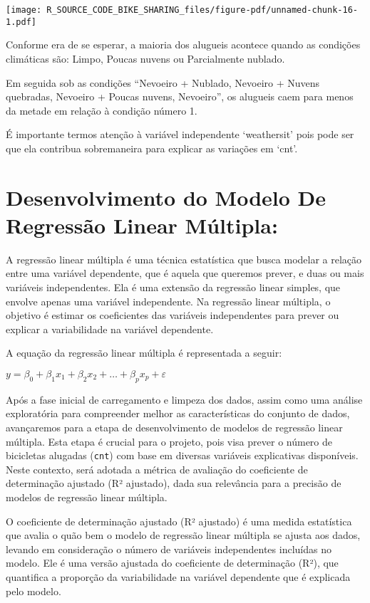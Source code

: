 \documentclass[
  letterpaper,
  DIV=11,
  numbers=noendperiod]{scrartcl}
\begin{document}
\begin{center}
\texttt{[image: R\_SOURCE\_CODE\_BIKE\_SHARING\_files/figure-pdf/unnamed-chunk-16-1.pdf]}
\end{center}

Conforme era de se esperar, a maioria dos alugueis acontece quando as
condições climáticas são: Limpo, Poucas nuvens ou Parcialmente nublado.

Em seguida sob as condições ``Nevoeiro + Nublado, Nevoeiro + Nuvens
quebradas, Nevoeiro + Poucas nuvens, Nevoeiro'', os alugueis caem para
menos da metade em relação à condição número 1.

É importante termos atenção à variável independente `weathersit' pois
pode ser que ela contribua sobremaneira para explicar as variações em
`cnt'.

\section{Desenvolvimento do Modelo De Regressão Linear
Múltipla:}\label{desenvolvimento-do-modelo-de-regressuxe3o-linear-muxfaltipla}

A regressão linear múltipla é uma técnica estatística que busca modelar
a relação entre uma variável dependente, que é aquela que queremos
prever, e duas ou mais variáveis independentes. Ela é uma extensão da
regressão linear simples, que envolve apenas uma variável independente.
Na regressão linear múltipla, o objetivo é estimar os coeficientes das
variáveis independentes para prever ou explicar a variabilidade na
variável dependente.

A equação da regressão linear múltipla é representada a seguir:

\(y = \beta_0 + \beta_1 x_1 + \beta_2 x_2 + \ldots + \beta_p x_p + \varepsilon\)

Após a fase inicial de carregamento e limpeza dos dados, assim como uma
análise exploratória para compreender melhor as características do
conjunto de dados, avançaremos para a etapa de desenvolvimento de
modelos de regressão linear múltipla. Esta etapa é crucial para o
projeto, pois visa prever o número de bicicletas alugadas (\texttt{cnt})
com base em diversas variáveis explicativas disponíveis. Neste contexto,
será adotada a métrica de avaliação do coeficiente de determinação
ajustado (R² ajustado), dada sua relevância para a precisão de modelos
de regressão linear múltipla.

O coeficiente de determinação ajustado (R² ajustado) é uma medida
estatística que avalia o quão bem o modelo de regressão linear múltipla
se ajusta aos dados, levando em consideração o número de variáveis
independentes incluídas no modelo. Ele é uma versão ajustada do
coeficiente de determinação (R²), que quantifica a proporção da
variabilidade na variável dependente que é explicada pelo modelo.
\end{document}
